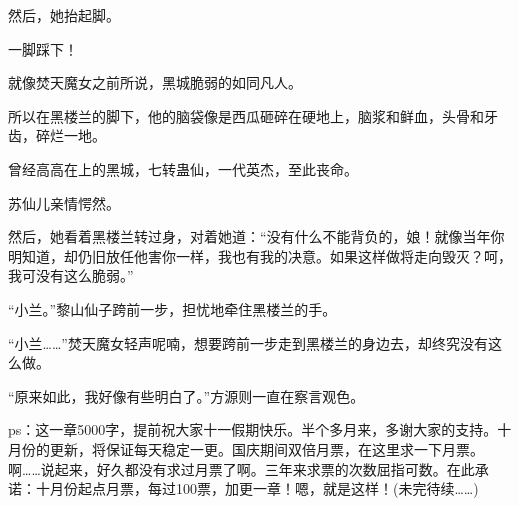 \begin{this_body}
然后，她抬起脚。

一脚踩下！

就像焚天魔女之前所说，黑城脆弱的如同凡人。

所以在黑楼兰的脚下，他的脑袋像是西瓜砸碎在硬地上，脑浆和鲜血，头骨和牙齿，碎烂一地。

曾经高高在上的黑城，七转蛊仙，一代英杰，至此丧命。

苏仙儿亲情愕然。

然后，她看着黑楼兰转过身，对着她道：“没有什么不能背负的，娘！就像当年你明知道，却仍旧放任他害你一样，我也有我的决意。如果这样做将走向毁灭？呵，我可没有这么脆弱。”

“小兰。”黎山仙子跨前一步，担忧地牵住黑楼兰的手。

“小兰……”焚天魔女轻声呢喃，想要跨前一步走到黑楼兰的身边去，却终究没有这么做。

“原来如此，我好像有些明白了。”方源则一直在察言观色。

ps：这一章5000字，提前祝大家十一假期快乐。半个多月来，多谢大家的支持。十月份的更新，将保证每天稳定一更。国庆期间双倍月票，在这里求一下月票。啊……说起来，好久都没有求过月票了啊。三年来求票的次数屈指可数。在此承诺：十月份起点月票，每过100票，加更一章！嗯，就是这样！(未完待续……)

\end{this_body}

